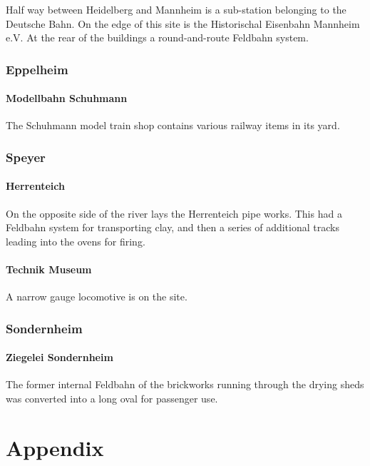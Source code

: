 \documentclass[a4paper]{report}
\begin{document}
Half way between Heidelberg and Mannheim is a sub-station belonging to
the Deutsche Bahn.  On the edge of this site is the Historischal
Eisenbahn Mannheim e.V.  At the rear of the buildings a
round-and-route Feldbahn system.

\section{Eppelheim}

\subsection{Modellbahn Schuhmann}

The Schuhmann model train shop contains various railway items in its yard.

\section{Speyer}

\subsection{Herrenteich}

On the opposite side of the river lays the Herrenteich pipe works.
This had a Feldbahn system for transporting clay, and then a series of
additional tracks leading into the ovens for firing.

\subsection{Technik Museum}

A narrow gauge locomotive is on the site.

\section{Sondernheim}

\subsection{Ziegelei Sondernheim}

The former internal Feldbahn of the brickworks running through the
drying sheds was converted into a long oval for passenger use.

\part{Appendix}


\end{document}
